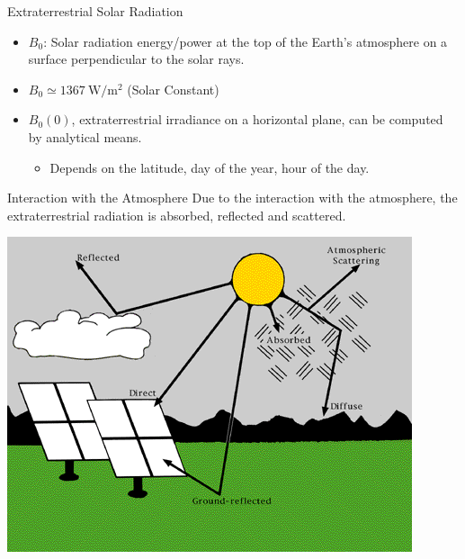 \documentclass[xcolor={usenames,svgnames,dvipsnames}]{beamer}
\begin{document}
\begin{frame}[label={sec:org5ccda1a}]{Extraterrestrial Solar Radiation}
\begin{itemize}
\item \(B_0\): Solar radiation energy/power at the top of the Earth's atmosphere on a surface perpendicular to the solar rays.
\item \(B_0 \simeq \SI{1367}{\watt\per\meter\squared}\) (Solar Constant)
\item \(B_0(0)\), extraterrestrial irradiance on a horizontal plane, can be computed by analytical means.
\begin{itemize}
\item Depends on the latitude, day of the year, hour of the day.
\end{itemize}
\end{itemize}
\end{frame}

\begin{frame}[label={sec:org56c8d69}]{Interaction with the Atmosphere}
Due to the interaction with the atmosphere, the extraterrestrial radiation is absorbed, reflected and scattered.

\begin{center}
\includegraphics[height=0.5\textheight]{../figs/SolarRadiationComponents_NREL.png}
\end{center}
\end{frame}
\end{document}
